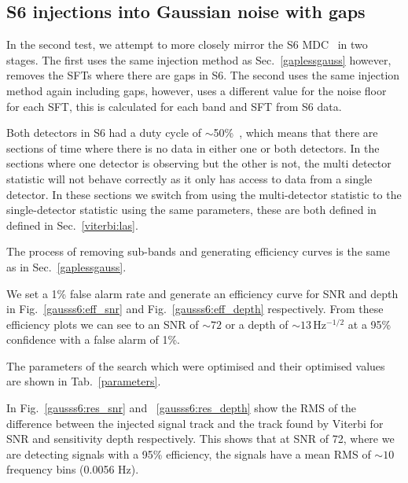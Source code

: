 \subsection{\label{gausss6} S6 injections into Gaussian noise with gaps}

%
%
In the second test, we attempt to more closely mirror the S6 \ac{MDC}~\citep{walsh2016ComparisonMethods} in two stages. The first uses the same injection method as Sec.~\ref{gaplessgauss} however, removes the \acp{SFT} where there are gaps in S6. 
The second uses the same injection method again including gaps, however, uses a different value for the noise floor for each \ac{SFT}, this is calculated for each band and \ac{SFT} from S6 data.

Both detectors in S6 had a duty cycle of $\sim$50\%~\citep{aasi2015CharacterizationLIGO}, which means that there are sections of time where there is no data in either one or both detectors. In the sections where one detector is observing but the other is not, the multi detector statistic will not behave correctly as it only has access to data from a single detector.
In these sections we switch from using the multi-detector statistic to the single-detector statistic using the same parameters, these are both defined in defined in Sec.~\ref{viterbi:las}.

%
%
The process of removing sub-bands and generating efficiency curves is the same as in Sec.~\ref{gaplessgauss}.


We set a 1\% false alarm rate and generate an efficiency curve for
\ac{SNR} and depth in Fig.~\ref{gausss6:eff_snr} and
Fig.~\ref{gausss6:eff_depth} respectively. From these efficiency plots we can
see to an \ac{SNR} of $\sim 72$ or a depth of $\sim 13$\,Hz$^{-1/2}$ at a 95\%
confidence with a false alarm of 1\%.

The parameters of the search which were optimised and their optimised values are shown in Tab.~\ref{parameters}.


In Fig.~\ref{gausss6:res_snr} and ~\ref{gausss6:res_depth} show the \ac{RMS} of the difference between the injected signal track and the track found by Viterbi for \ac{SNR} and sensitivity depth respectively. This shows that at \ac{SNR} of 72, where we are detecting signals with a 95\% efficiency, the signals have a mean \ac{RMS} of $\sim 10$ frequency bins (0.0056 Hz).

